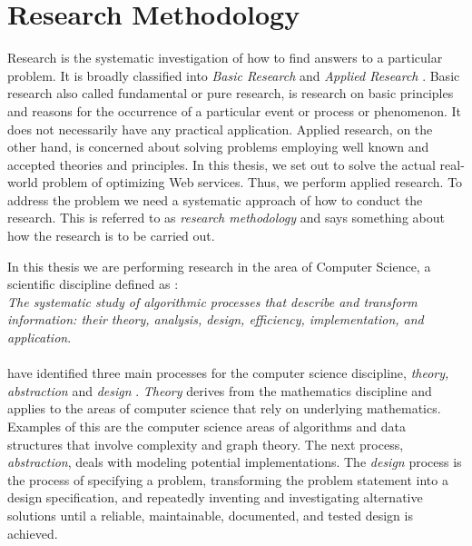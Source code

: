 \section{Research Methodology}

Research is the systematic investigation of how to find answers to a particular
problem. It is broadly classified into \textit{Basic Research} and
\textit{Applied Research} \cite{rajasekar2006research}. Basic research also
called fundamental or pure research, is research on basic principles and reasons
for the occurrence of a particular event or process or phenomenon. It does not
necessarily have any practical application. Applied research, on the other hand,
is concerned about solving problems employing well known and accepted theories
and principles. In this thesis, we set out to solve the actual real-world
problem of optimizing Web services. Thus, we perform applied research. To
address the problem we need a systematic approach of how to conduct the
research. This is referred to as \textit{research methodology} and says
something about how the research is to be carried out.

In this thesis we are performing research in the area of Computer Science, a
scientific discipline defined as \cite{denning}: \\

\textit{The systematic study of algorithmic processes that
describe and transform information: their theory, analysis, design, efficiency,
implementation, and application}.

\paragraph{}

 \citeauthor{denning} have identified three main processes for the computer
 science discipline, \textit{theory, abstraction} and \textit{design}
 \cite{denning}. \textit{Theory} derives from the mathematics discipline and
 applies to the areas of computer science that rely on underlying mathematics.
 Examples of this are the computer science areas of algorithms and data
 structures that involve complexity and graph theory. The next process,
 \textit{abstraction}, deals with modeling potential implementations. The
 \textit{design} process is the process of specifying a problem, transforming
 the problem statement into a design specification, and repeatedly inventing and
 investigating alternative solutions until a reliable, maintainable, documented,
 and tested design is achieved.

